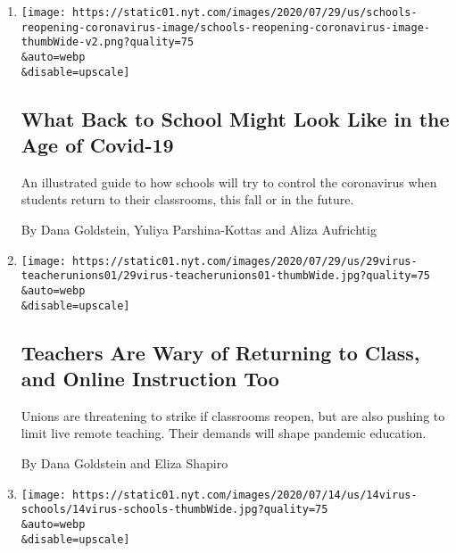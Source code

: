 \begin{enumerate}
\def\labelenumi{\arabic{enumi}.}
\item
  \href{/interactive/2020/07/29/us/schools-reopening-coronavirus.html}{}

  \texttt{[image: https://static01.nyt.com/images/2020/07/29/us/schools-reopening-coronavirus-image/schools-reopening-coronavirus-image-thumbWide-v2.png?quality=75\\\&auto=webp\\\&disable=upscale]}

  \hypertarget{what-back-to-school-might-look-like-in-the-age-of-covid-19}{%
  \subsection{What Back to School Might Look Like in the Age of
  Covid-19}\label{what-back-to-school-might-look-like-in-the-age-of-covid-19}}

  An illustrated guide to how schools will try to control the
  coronavirus when students return to their classrooms, this fall or in
  the future.

  By Dana Goldstein, Yuliya Parshina-Kottas and Aliza Aufrichtig
\item
  \href{/2020/07/29/us/teacher-union-school-reopening-coronavirus.html}{}

  \texttt{[image: https://static01.nyt.com/images/2020/07/29/us/29virus-teacherunions01/29virus-teacherunions01-thumbWide.jpg?quality=75\\\&auto=webp\\\&disable=upscale]}

  \hypertarget{teachers-are-wary-of-returning-to-class-and-online-instruction-too}{%
  \subsection{Teachers Are Wary of Returning to Class, and Online
  Instruction
  Too}\label{teachers-are-wary-of-returning-to-class-and-online-instruction-too}}

  Unions are threatening to strike if classrooms reopen, but are also
  pushing to limit live remote teaching. Their demands will shape
  pandemic education.

  By Dana Goldstein and Eliza Shapiro
\item
  \href{/2020/07/14/us/coronavirus-schools-fall.html}{}

  \texttt{[image: https://static01.nyt.com/images/2020/07/14/us/14virus-schools/14virus-schools-thumbWide.jpg?quality=75\\\&auto=webp\\\&disable=upscale]}

  \hypertarget{most-big-school-districts-arent-ready-to-reopen-heres-why}{%
}
\end{enumerate}
